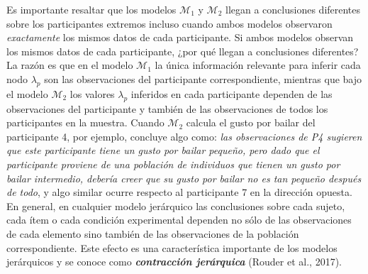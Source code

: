 \documentclass{article}
\begin{document}
\indent Es importante resaltar que los modelos $\mathcal M_1$ y $\mathcal M_2$ llegan a conclusiones diferentes sobre los participantes extremos incluso cuando ambos modelos observaron \emph{exactamente} los mismos datos de cada participante. Si ambos modelos observan los mismos datos de cada participante, ¿por qué llegan a conclusiones diferentes? La razón es que en el modelo $\mathcal M_1$ la única información relevante para inferir cada nodo $\lambda_p$ son las observaciones del participante correspondiente, mientras que bajo el modelo $\mathcal M_2$ los valores $\lambda_p$ inferidos en cada participante dependen de las observaciones del participante y también de las observaciones de todos los participantes en la muestra. Cuando $\mathcal M_2$ calcula el gusto por bailar del participante 4, por ejemplo, concluye algo como: \emph{las observaciones de P4 sugieren que este participante tiene un gusto por bailar pequeño, pero dado que el participante proviene de una población de individuos que tienen un gusto por bailar intermedio, debería creer que su gusto por bailar no es tan pequeño después de todo}, y algo similar ocurre respecto al participante 7 en la dirección opuesta. En general, en cualquier modelo jerárquico las conclusiones sobre cada sujeto, cada ítem o cada condición experimental dependen no sólo de las observaciones de cada elemento sino también de las observaciones de la población correspondiente. Este efecto es una característica importante de los modelos jerárquicos y se conoce como \emph{\textbf{contracción jerárquica}} (Rouder et al., 2017). \\
\end{document}
